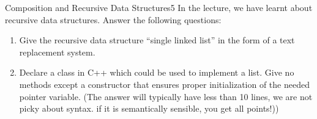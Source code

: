 \documentclass[twoside]{article}
\begin{document}
    \begin{task}{Composition and Recursive Data Structures}{5}{}
      In the lecture, we have learnt about recursive data structures. Answer the following questions:

      \begin{enumerate}
      \item{Give the recursive data structure ``single linked list'' in the form of a text replacement system. \vspace{5cm}}
        \item{Declare a class in C++ which could be used to implement a list. Give no methods except a constructor that ensures proper initialization of the needed pointer variable. (The answer will typically have less than 10 lines, we are not picky about syntax. if it is semantically sensible, you get all points!)) \vspace{6cm}}

        \end{enumerate}


    \end{task}
\end{document}
